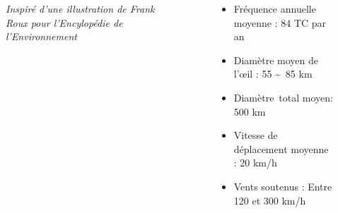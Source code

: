 \documentclass[aspectratio=169, usepdftitle=false, xcolor={dvipsnames}, 9pt,table]{beamer}
\begin{document}
\begin{frame}[t]
\begin{columns}
\begin{column}{0.5\textwidth}
\begin{figure}
                \caption{\textit{Inspiré d'une illustration de Frank Roux pour l'Encylopédie de l'Environnement}}
            \end{figure}
        \end{column}
        \begin{column}{0.5\textwidth}
           \setlength{\leftmargini}{2.5ex}
           \vspace{-2em}
           \begin{block} 
                \footnotesize
                \begin{itemize}
                    \item Fréquence annuelle moyenne : 84 TC par an \mbox{\parencite{schreck_impact_2014}}
                    \item Diamètre moyen de l'œil : 55 \sim~85 km \mbox{\parencite{weatherford_typhoon_1985}}
                    \item Diamètre\footnotemark~total moyen: 500 km \parencite{carrasco_influence_2014}
                    \item Vitesse de déplacement moyenne : 20 km/h
                    \item Vents soutenus : Entre 120 et 300 km/h
                \end{itemize}
            \end{block}
        \end{column}
    \end{columns}
    \renewcommand*{\thefootnote}{\arabic{footnote}}
    \setcounter{footnote}{0}
\end{frame}
\end{document}
